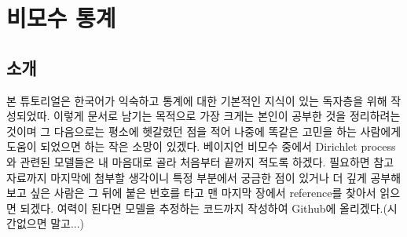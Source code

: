 \documentclass[a4paper, 10pt]{book}
\begin{document}
\nocite{*}

\chapter{비모수 통계}
\section{소개}
  본 튜토리얼은 한국어가 익숙하고 통계에 대한 기본적인 지식이 있는 독자층을 위해 작성되었따. 이렇게 문서로 남기는 목적으로 가장 크게는 본인이 공부한 것을 정리하려는 것이며 그 다음으로는 평소에 헷갈렸던 점을 적어 나중에 똑같은 고민을 하는 사람에게 도움이 되었으면 하는 작은 소망이 있겠다. 베이지언 비모수 중에서 Dirichlet process와 관련된 모델들은 내 마음대로 골라 처음부터 끝까지 적도록 하겠다. 필요하면 참고 자료까지 마지막에 첨부할 생각이니 특정 부분에서 궁금한 점이 있거나 더 깊게 공부해보고 싶은 사람은 그 뒤에 붙은 번호를 타고 맨 마지막 장에서 reference를 찾아서 읽으면 되겠다. 여력이 된다면 모델을 추정하는 코드까지 작성하여 Github에 올리겠다.(시간없으면 말고...)
\end{document}

